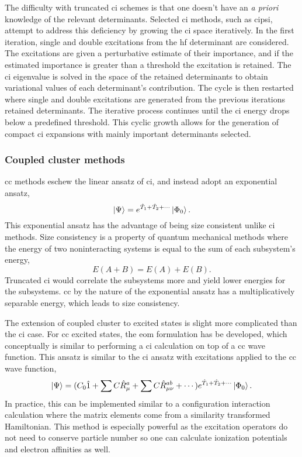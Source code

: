 The difficulty with truncated \gls{ci} schemes is that one doesn't have an \textit{a priori} knowledge of the relevant determinants.
Selected \gls{ci} methods, such as \gls{cipsi},\cite{10.1063/1.1679199} attempt to address this deficiency by growing the \gls{ci} space iteratively.
In the first iteration, single and double excitations from the \gls{hf} determinant are considered.
The excitations are given a perturbative estimate of their importance, and if the estimated importance is greater than a threshold the excitation is retained.
The \gls{ci} eigenvalue is solved in the space of the retained determinants to obtain variational values of each determinant's contribution.
The cycle is then restarted where single and double excitations are generated from the previous iterations retained determinants.
The iterative process continues until the \gls{ci} energy drops below a predefined threshold.
This cyclic growth allows for the generation of compact \gls{ci} expansions with mainly important determinants selected.

\subsubsection{Coupled cluster methods}
\Gls{cc} methods eschew the linear ansatz of \gls{ci}, and instead adopt an exponential ansatz,
\begin{equation}
    \ket{\Psi} = e^{\hat{T}_1 + \hat{T}_2 + \cdots}\ket{\Phi_0}.
    \label{eq:cc_ansatz}
\end{equation}
This exponential ansatz has the advantage of being size consistent unlike \gls{ci} methods.
Size consistency is a property of quantum mechanical methods where the energy of two noninteracting systems  is equal to the sum of each subsystem's energy,
\begin{equation}
    E(A+B) = E(A) + E(B).
\end{equation}
Truncated \gls{ci} would correlate the subsystems more and yield lower energies for the subsystems.
\gls{cc} by the nature of the exponential ansatz has a multiplicatively separable energy, which leads to size consistency.\cite{10.1002/wcms.76,10.1146/annurev.pc.32.100181.002043}

The extension of coupled cluster to excited states is slight more complicated than the \gls{ci} case. 
For \gls{cc} excited states, the \gls{eom} formulation has be developed, which conceptually is similar to performing a \gls{ci} calculation on top of a \gls{cc} wave function.\cite{10.1016/0009-26149389023-B, 10.1063/1.464746}
This ansatz is similar to the \gls{ci} ansatz with excitations applied to the \gls{cc} wave function,
\begin{equation}
    \ket{\Psi} = (C_0 \hat{1} + \sum C \hat{R}_{\mu}^{a} + \sum C \hat{R}_{\mu\nu}^{ab} + \cdots ) e^{\hat{T}_1 + \hat{T}_2 + \cdots}\ket{\Phi_0}.
\end{equation}
In practice, this can be implemented similar to a configuration interaction calculation where the matrix elements come from a similarity transformed Hamiltonian.
This method is especially powerful as the excitation operators do not need to conserve particle number so one can calculate ionization potentials and electron affinities as well.\cite{10.1063/1.468592, 10.1016/0009-26148987149-0, 10.1063/1.468022, 10.1063/1.469817}
